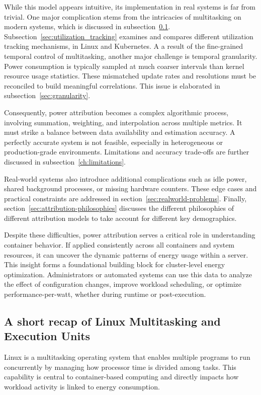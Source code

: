 While this model appears intuitive, its implementation in real systems is far from trivial. One major complication stems from the intricacies of multitasking on modern systems, which is discussed in subsection~\ref{sec:linux-multitasking}. Subsection~\ref{sec:utilization_tracking} examines and compares different utilization tracking mechanisms, in Linux and Kubernetes. A a result of the fine-grained temporal control of multitasking, another major challenge is temporal granularity. Power consumption is typically sampled at much coarser intervals than kernel resource usage statistics. These mismatched update rates and resolutions must be reconciled to build meaningful correlations. This issue is elaborated in subsection~\ref{sec:granularity}.

Consequently, power attribution becomes a complex algorithmic process, involving summation, weighting, and interpolation across multiple metrics. It must strike a balance between data availability and estimation accuracy. A perfectly accurate system is not feasible, especially in heterogeneous or production-grade environments. Limitations and accuracy trade-offs are further discussed in subsection~\ref{ch:limitations}.

Real-world systems also introduce additional complications such as idle power, shared background processes, or missing hardware counters. These edge cases and practical constraints are addressed in section~\ref{sec:realworld-problems}. Finally, section~\ref{sec:attribution-philosophies} discusses the different philosophies of different attribution models to take account for different key demographics.

Despite these difficulties, power attribution serves a critical role in understanding container behavior. If applied consistently across all containers and system resources, it can uncover the dynamic patterns of energy usage within a server. This insight forms a foundational building block for cluster-level energy optimization. Administrators or automated systems can use this data to analyze the effect of configuration changes, improve workload scheduling, or optimize performance-per-watt, whether during runtime or post-execution.

\subsection{A short recap of Linux Multitasking and Execution Units}
\label{sec:linux-multitasking}
Linux is a multitasking operating system that enables multiple programs to run concurrently by managing how processor time is divided among tasks. This capability is central to container-based computing and directly impacts how workload activity is linked to energy consumption.

